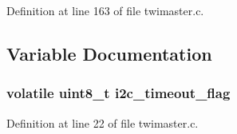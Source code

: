 Definition at line 163 of file twimaster.\-c.



\subsection{Variable Documentation}
\hypertarget{group__pfleury__ic2master_ga10c7c5776234d15f07c3e63a0c6f6518}{
\subsubsection[{i2c\-\_\-timeout\-\_\-flag}]{\setlength{\rightskip}{0pt plus 5cm}volatile uint8\-\_\-t i2c\-\_\-timeout\-\_\-flag}}\label{group__pfleury__ic2master_ga10c7c5776234d15f07c3e63a0c6f6518}


Definition at line 22 of file twimaster.\-c.

